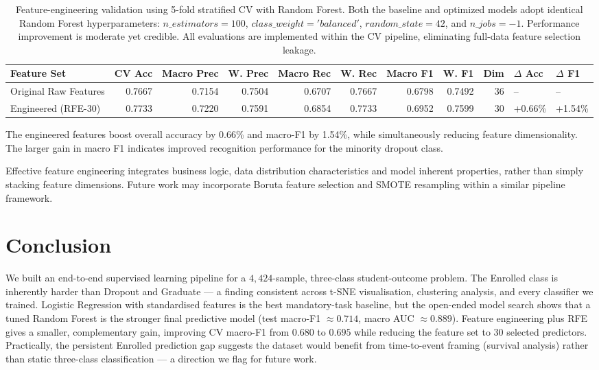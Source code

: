 \documentclass[11pt]{article}
\begin{document}
\begin{table}[h]
\centering
\small
\setlength{\tabcolsep}{3pt}
\caption{Feature-engineering validation using 5-fold stratified CV with Random Forest. Both the baseline and optimized models adopt identical Random Forest hyperparameters: $n\_estimators=100$, $class\_weight='balanced'$, $random\_state=42$, and $n\_jobs=-1$. Performance improvement is moderate yet credible. All evaluations are implemented within the CV pipeline, eliminating full-data feature selection leakage.}
\label{tab:feat_eng_valid}
\begin{tabular}{lrrrrrrrrll}
\toprule
Feature Set & CV Acc & Macro Prec & W. Prec & Macro Rec & W. Rec & Macro F1 & W. F1 & Dim & $\Delta$ Acc & $\Delta$ F1 \\
\midrule
Original Raw Features & 0.7667 & 0.7154 & 0.7504 & 0.6707 & 0.7667 & 0.6798 & 0.7492 & 36 & -- & -- \\
Engineered (RFE-30) & 0.7733 & 0.7220 & 0.7591 & 0.6854 & 0.7733 & 0.6952 & 0.7599 & 30 & +0.66\% & +1.54\% \\
\bottomrule
\end{tabular}
\end{table}

The engineered features boost overall accuracy by 0.66\% and macro-F1 by 1.54\%, while simultaneously reducing feature dimensionality. The larger gain in macro F1 indicates improved recognition performance for the minority dropout class.

Effective feature engineering integrates business logic, data distribution characteristics and model inherent properties, rather than simply stacking feature dimensions. Future work may incorporate Boruta feature selection and SMOTE resampling within a similar pipeline framework.



\section{Conclusion}

We built an end-to-end supervised learning pipeline for a $4{,}424$-sample,
three-class student-outcome problem. The Enrolled class is inherently
harder than Dropout and Graduate --- a finding consistent across
t-SNE visualisation, clustering analysis, and every classifier we
trained. Logistic Regression with standardised features is the best
mandatory-task baseline, but the open-ended model search shows that a
tuned Random Forest is the stronger final predictive model
(test macro-F1 $\approx 0.714$, macro AUC $\approx 0.889$).
Feature engineering plus RFE gives a smaller, complementary gain,
improving CV macro-F1 from $0.680$ to $0.695$ while reducing the
feature set to 30 selected predictors. Practically, the persistent
Enrolled prediction gap suggests the dataset would benefit from
time-to-event framing (survival analysis) rather than static
three-class classification --- a direction we flag for future work.
\end{document}
